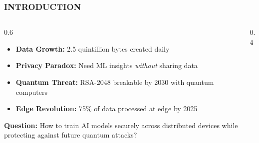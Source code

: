 \documentclass[aspectratio=169]{beamer}
\begin{document}
\begin{frame}
    \frametitle{INTRODUCTION}
    \begin{columns}
        \begin{column}{0.6\textwidth}
            \begin{itemize}
                \item \textbf{Data Growth:} 2.5 quintillion bytes created daily
                \item \textbf{Privacy Paradox:} Need ML insights \textit{without} sharing data
                \item \textbf{Quantum Threat:} RSA-2048 breakable by 2030 with quantum computers
                \item \textbf{Edge Revolution:} 75\% of data processed at edge by 2025
            \end{itemize}
            
            \textbf{Question:} How to train AI models securely across distributed devices while protecting against future quantum attacks?
        \end{column}
        \begin{column}{0.4\textwidth}
        \end{column}
    \end{columns}
\end{frame}
\end{document}
